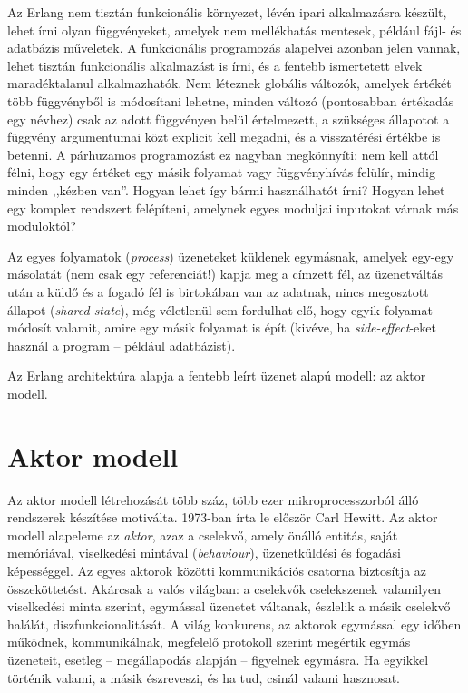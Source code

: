 \documentclass[12pt, a4paper, oneside]{book}
\begin{document}
Az Erlang nem tisztán funkcionális környezet, lévén ipari alkalmazásra
készült, lehet írni olyan függvényeket, amelyek nem mellékhatás mentesek,
például fájl- és adatbázis műveletek. A funkcionális programozás alapelvei
azonban jelen vannak, lehet tisztán funkcionális alkalmazást is írni, és a
fentebb ismertetett elvek maradéktalanul alkalmazhatók. Nem léteznek globális
változók, amelyek értékét több függvényből is módosítani lehetne, minden
változó (pontosabban értékadás egy névhez) csak az adott függvényen belül
értelmezett, a szükséges állapotot a függvény argumentumai közt explicit kell
megadni, és a visszatérési értékbe is betenni. A párhuzamos programozást ez
nagyban megkönnyíti: nem kell attól félni, hogy egy értéket egy másik folyamat
vagy függvényhívás felülír, mindig minden ,,kézben van''. Hogyan lehet így
bármi használhatót írni? Hogyan lehet egy komplex rendszert felépíteni,
amelynek egyes moduljai inputokat várnak más moduloktól?

Az egyes folyamatok (\emph{process}) üzeneteket küldenek egymásnak, amelyek
egy-egy másolatát (nem csak egy referenciát!) kapja meg a címzett fél, az
üzenetváltás után a küldő és a fogadó fél is birtokában van az adatnak, nincs
megosztott állapot (\emph{shared state}), még véletlenül sem fordulhat elő,
hogy egyik folyamat módosít valamit, amire egy másik folyamat is épít (kivéve,
ha \emph{side-effect}-eket használ a program -- például adatbázist).

Az Erlang architektúra alapja a fentebb leírt üzenet alapú modell: az aktor
modell.

\section{Aktor modell} 

Az aktor modell létrehozását több száz, több ezer mikroprocesszorból álló
rendszerek készítése motiválta. 1973-ban írta le először Carl Hewitt. Az aktor
modell alapeleme az \emph{aktor}, azaz a cselekvő, amely önálló entitás, saját
memóriával, viselkedési mintával (\emph{behaviour}), üzenetküldési és fogadási
képességgel. Az egyes aktorok közötti kommunikációs csatorna biztosítja az
összeköttetést. Akárcsak a valós világban: a cselekvők cselekszenek valamilyen
viselkedési minta szerint, egymással üzenetet váltanak, észlelik a másik
cselekvő halálát, diszfunkcionalitását. A világ konkurens, az aktorok egymással
egy időben működnek, kommunikálnak, megfelelő protokoll szerint megértik
egymás üzeneteit, esetleg -- megállapodás alapján -- figyelnek egymásra. Ha
egyikkel történik valami, a másik észreveszi, és ha tud, csinál valami
hasznosat.
\end{document}
